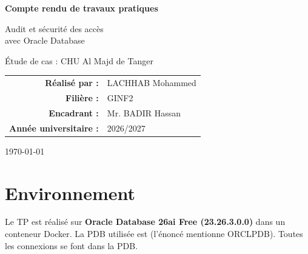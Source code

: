 \documentclass[11pt,a4paper]{article}
\newcommand{\code}[1]{\texttt{\detokenize{#1}}}
\begin{document}
\begin{titlepage}
\centering
\vspace*{2cm}
{\Huge\bfseries Compte rendu de travaux pratiques\par}
\vspace{0.5cm}
{\LARGE Audit et sécurité des accès\\[0.2cm] avec Oracle Database\par}
\vspace{0.5cm}
{\large Étude de cas : CHU Al Majd de Tanger\par}
\vfill
\begin{tabular}{rl}
  \textbf{Réalisé par :}        & LACHHAB Mohammed \\[0.2cm]
  \textbf{Filière :}            & GINF2 \\[0.2cm]
  \textbf{Encadrant :}          & Mr. BADIR Hassan \\[0.2cm]
  \textbf{Année universitaire :} & 2026/2027
\end{tabular}
\vfill
{\today}
\end{titlepage}

\tableofcontents
\newpage

\section*{Environnement}

Le TP est réalisé sur \textbf{Oracle Database 26ai Free (23.26.3.0.0)} dans un conteneur Docker.
La PDB utilisée est \code{FREEPDB1} (l'énoncé mentionne ORCLPDB). Toutes les connexions se font dans la PDB.

\newpage










\end{document}
